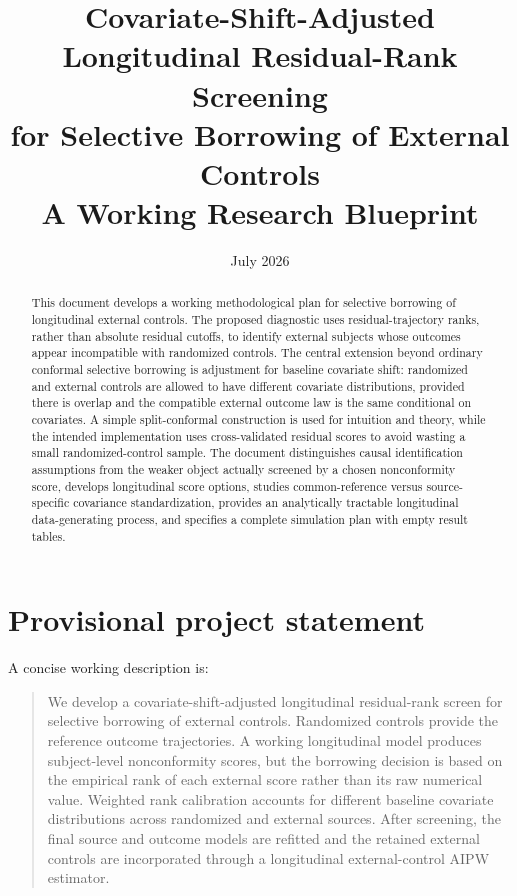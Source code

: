 \documentclass[11pt]{article}
\title{\textbf{Covariate-Shift-Adjusted Longitudinal Residual-Rank Screening\\for Selective Borrowing of External Controls}\\[0.5em]
\large A Working Research Blueprint}
\author{}
\date{July 2026}
\begin{document}
\maketitle

\begin{abstract}
This document develops a working methodological plan for selective borrowing of longitudinal external controls. The proposed diagnostic uses residual-trajectory ranks, rather than absolute residual cutoffs, to identify external subjects whose outcomes appear incompatible with randomized controls. The central extension beyond ordinary conformal selective borrowing is adjustment for baseline covariate shift: randomized and external controls are allowed to have different covariate distributions, provided there is overlap and the compatible external outcome law is the same conditional on covariates. A simple split-conformal construction is used for intuition and theory, while the intended implementation uses cross-validated residual scores to avoid wasting a small randomized-control sample. The document distinguishes causal identification assumptions from the weaker object actually screened by a chosen nonconformity score, develops longitudinal score options, studies common-reference versus source-specific covariance standardization, provides an analytically tractable longitudinal data-generating process, and specifies a complete simulation plan with empty result tables.
\end{abstract}

\tableofcontents
\newpage

\section{Provisional project statement}

A concise working description is:

\begin{quote}
We develop a covariate-shift-adjusted longitudinal residual-rank screen for selective borrowing of external controls. Randomized controls provide the reference outcome trajectories. A working longitudinal model produces subject-level nonconformity scores, but the borrowing decision is based on the empirical rank of each external score rather than its raw numerical value. Weighted rank calibration accounts for different baseline covariate distributions across randomized and external sources. After screening, the final source and outcome models are refitted and the retained external controls are incorporated through a longitudinal external-control AIPW estimator.
\end{quote}
\end{document}
